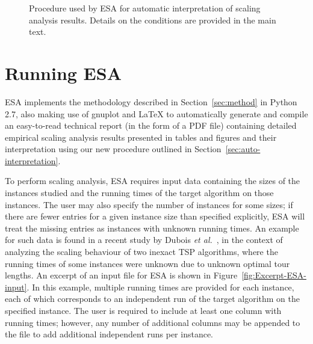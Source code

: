 \documentclass[aic]{iosart2x}
\newcommand{\etal}{\emph{et al.}}
\begin{document}
\begin{figure}[t]
\begin{centering}
{{\begin{tikzpicture}[node distance = 7em, auto]
\end{tikzpicture}}
}

\par\end{centering}{\small \par}

\caption{Procedure used by ESA for automatic interpretation of scaling analysis results. Details on the conditions are provided in the main text.}\label{fig:ESA-auto-interpretation}
\end{figure}


\section{Running ESA}
\label{sec:Implementation and Use}

ESA implements the methodology described in Section~\ref{sec:method} in Python 2.7, also making use of gnuplot and \LaTeX{} to automatically generate and compile an easy-to-read technical report (in the form of a PDF file) containing detailed empirical scaling analysis results presented in tables and figures and their interpretation using our new procedure outlined in Section~\ref{sec:auto-interpretation}.

\label{sec:ESA-Input}

To perform scaling analysis, ESA requires input data containing the sizes of the instances studied and the running times of the target algorithm on those instances. 
The user may also specify the number of instances for some sizes; if there are fewer entries for a given instance size than specified explicitly, ESA will treat the missing entries as instances with unknown running times. 
An example for such data is found in a recent study by Dubois \etal~\cite{DubEtAl15}, in the context of analyzing the scaling behaviour of two inexact TSP algorithms, where the running times of some instances were unknown due to unknown optimal tour lengths. 
An excerpt of an input file for ESA is shown in Figure~\ref{fig:Excerpt-ESA-input}. 
In this example, multiple running times are provided for each instance, each of which corresponds to an independent run of the target algorithm on the specified instance. The user is required to include at least one column with running times; however, any number of additional columns may be appended to the file to add additional independent runs per instance. 
\end{document}
